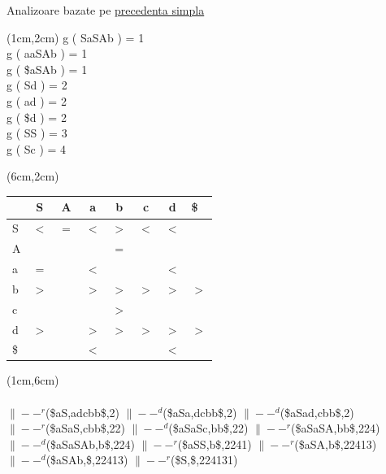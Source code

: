 \documentclass[pdf]{beamer}
\begin{document}
\begin{frame}{Analizoare bazate pe \underline{precedenta simpla}}

\begin{textblock*}{3.8cm}(1cm,2cm) 
g ( SaSAb ) = 1\\
g ( aaSAb ) = 1\\
g ( \$aSAb ) = 1\\
g ( Sd ) = 2\\
g ( ad ) = 2\\
g ( \$d ) = 2\\
g ( SS ) = 3\\
g ( Sc ) = 4\\
\end{textblock*}

\begin{textblock*}{3.8cm}(6cm,2cm) 
\begin{tabular}{| l | c | c | c | c | c | c | l|}
    \hline
       & S & A & a & b & c & d & \$ \\
     \hline
     S & $<$ & $=$ & $<$ & $>$ & $<$ & $<$ &  \\
     \hline
     A &  &  &  & $=$ &  &  &  \\
     \hline
     a & $=$ &  & $<$ &  &  & $<$ &  \\
     \hline
     b & $>$ &  & $>$ & $>$ & $>$ & $>$ & $>$ \\
     \hline
     c &  &  &  & $>$ &  & &  \\
     \hline
     d & $>$ &  & $>$ & $>$ & $>$ & $>$ & $>$ \\
     \hline
     \$ &  &  & $<$ &  &  & $<$ &  \\
    \hline
\end{tabular}
\end{textblock*}

\begin{textblock*}{14cm}(1cm,6cm)
 \\
\\
$\|--^{r}$(\$aS,adcbb\$,2) 
$\|--^{d}$(\$aSa,dcbb\$,2)
$\|--^{d}$(\$aSad,cbb\$,2)\\
$\|--^{r}$(\$aSaS,cbb\$,22)
$\|--^{d}$(\$aSaSc,bb\$,22)
$\|--^{r}$(\$aSaSA,bb\$,224)\\
$\|--^{d}$(\$aSaSAb,b\$,224)
$\|--^{r}$(\$aSS,b\$,2241)
$\|--^{r}$(\$aSA,b\$,22413)\\
$\|--^{d}$(\$aSAb,\$,22413)
$\|--^{r}$(\$S,\$,224131)
\end{textblock*}
\end{frame}
\end{document}
